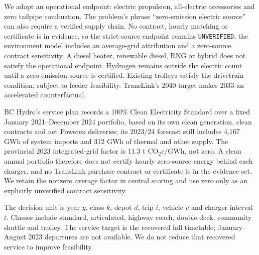\documentclass[12pt,letterpaper]{article}
\begin{document}
We adopt an operational endpoint: electric propulsion, all-electric accessories and zero tailpipe combustion. The problem's phrase ``zero-emission electric source'' can also require a verified supply chain. No contract, hourly matching or certificate is in evidence, so the strict-source endpoint remains \texttt{UNVERIFIED}; the environment model includes an average-grid attribution and a zero-source contract sensitivity. A diesel heater, renewable diesel, RNG or hybrid does not satisfy the operational endpoint. Hydrogen remains outside the electric count until a zero-emission source is certified. Existing trolleys satisfy the drivetrain condition, subject to feeder feasibility. TransLink's 2040 target makes 2033 an accelerated counterfactual.\cite{fleet2020,playbook2024}

BC Hydro's service plan records a 100\% Clean Electricity Standard over a fixed January 2021--December 2024 portfolio, based on its own clean generation, clean contracts and net Powerex deliveries; its 2023/24 forecast still includes 4,167 GWh of system imports and 312 GWh of thermal and other supply. The provincial 2023 integrated-grid factor is 11.3 t CO$_2$e/GWh, not zero. A clean annual portfolio therefore does not certify hourly zero-source energy behind each charger, and no TransLink purchase contract or certificate is in the evidence set. We retain the nonzero average factor in central scoring and use zero only as an explicitly unverified contract sensitivity.\cite{bchydro2023service,bcgrid}

The decision unit is year $y$, class $k$, depot $d$, trip $i$, vehicle $v$ and charger interval $t$. Classes include standard, articulated, highway coach, double-deck, community shuttle and trolley. The service target is the recovered fall timetable; January--August 2023 departures are not available. We do not reduce that recovered service to improve feasibility.
\end{document}
